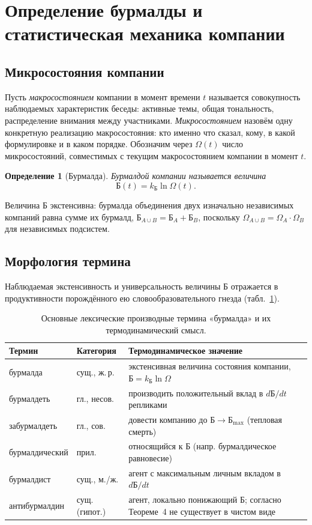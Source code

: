\documentclass[11pt,a4paper]{article}
\newtheorem{definition}{Определение}
\newcommand{\Burm}{\text{Б}}
\newcommand{\kB}{k_{\text{Б}}}
\begin{document}
\section{Определение бурмалды и статистическая механика компании}

\subsection{Микросостояния компании}

Пусть \emph{макросостоянием} компании в момент времени $t$ называется совокупность наблюдаемых характеристик беседы: активные темы, общая тональность, распределение внимания между участниками. \emph{Микросостоянием} назовём одну конкретную реализацию макросостояния: кто именно что сказал, кому, в какой формулировке и в каком порядке. Обозначим через $\Omega(t)$ число микросостояний, совместимых с текущим макросостоянием компании в момент $t$.

\begin{definition}[Бурмалда]
Бурмалдой компании называется величина
\[
\Burm(t) = \kB \ln \Omega(t).
\]
\end{definition}

Величина $\Burm$ экстенсивна: бурмалда объединения двух изначально независимых компаний равна сумме их бурмалд, $\Burm_{A\cup B}=\Burm_A+\Burm_B$, поскольку $\Omega_{A\cup B}=\Omega_A\cdot\Omega_B$ для независимых подсистем.

\subsection{Морфология термина}

Наблюдаемая экстенсивность и универсальность величины $\Burm$ отражается в продуктивности порождённого ею словообразовательного гнезда (табл.~\ref{tab:lexicon}).

\begin{table}[h!]
\centering
\caption{Основные лексические производные термина «бурмалда» и их термодинамический смысл.}
\label{tab:lexicon}
\begin{tabular}{@{}p{3.6cm}p{2.0cm}p{7.9cm}@{}}
\toprule
Термин & Категория & Термодинамическое значение \\
\midrule
бурмалда & сущ., ж.\,р. & экстенсивная величина состояния компании, $\Burm=\kB\ln\Omega$ \\[3pt]
бурмалдеть & гл., несов. & производить положительный вклад в $d\Burm/dt$ репликами \\[3pt]
забурмалдеть & гл., сов. & довести компанию до $\Burm\to\Burm_{\max}$ (тепловая смерть) \\[3pt]
бурмалдический & прил. & относящийся к $\Burm$ (напр. бурмалдическое равновесие) \\[3pt]
бурмалдист & сущ., м./ж. & агент с максимальным личным вкладом в $d\Burm/dt$ \\[3pt]
антибурмалдин & сущ. (гипот.) & агент, локально понижающий $\Burm$; согласно Теореме~4 не существует в чистом виде \\
\bottomrule
\end{tabular}
\end{table}
\end{document}
